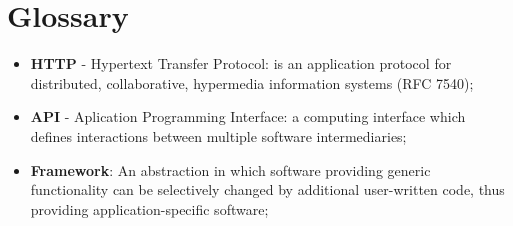 \chapter*{Glossary}

\begin{itemize}
    \item \textbf{HTTP} - Hypertext Transfer Protocol: is an application protocol for distributed,
     collaborative, hypermedia information systems (RFC 7540);
    \item \textbf{API} - Aplication Programming Interface: a computing interface which defines
     interactions between multiple software intermediaries;
    \item \textbf{Framework}: An abstraction in which software providing generic functionality can
     be selectively changed by additional user-written code,
     thus providing application-specific software;
\end{itemize}
